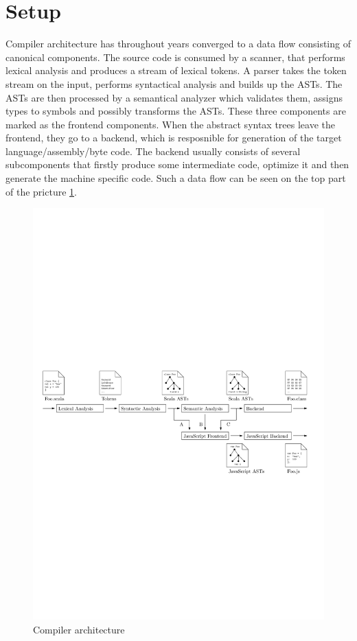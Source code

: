 \documentclass[12pt,a4paper]{report}
\begin{document}
\section{Setup}

Compiler architecture has throughout years converged to a data flow consisting of canonical components. The source code is consumed by a scanner, that performs lexical analysis and produces a stream of lexical tokens. A parser takes the token stream on the input, performs syntactical analysis and builds up the ASTs. The ASTs are then processed by a semantical analyzer which validates them, assigns types to symbols and possibly transforms the ASTs. These three components are marked as the frontend components. When the abstract syntax trees leave the frontend, they go to a backend, which is resposnible for generation of the target language/assembly/byte code. The backend usually consists of several subcomponents that firstly produce some intermediate code, optimize it and then generate the machine specific code. Such a data flow can be seen on the top part of the pricture \ref{Compiler}.

\begin{figure}[ht]
  \centering
	\includegraphics[width=\linewidth,height=\textheight,keepaspectratio]{img/Compiler.pdf}
	\caption{Compiler architecture}
	\label{Compiler}
\end{figure}
\end{document}
